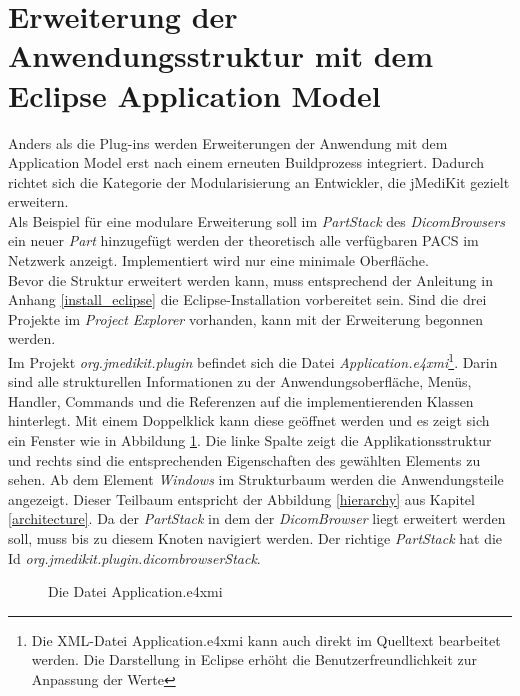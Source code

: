 \FloatBarrier
\section{Erweiterung der Anwendungsstruktur mit dem Eclipse Application Model}
Anders als die Plug-ins werden Erweiterungen der Anwendung mit dem Application Model erst nach einem erneuten Buildprozess integriert. Dadurch richtet sich die Kategorie der Modularisierung an Entwickler, die jMediKit gezielt erweitern.\\
Als Beispiel für eine modulare Erweiterung soll im \textit{PartStack} des \textit{DicomBrowsers} ein neuer \textit{Part} hinzugefügt werden der theoretisch alle verfügbaren PACS im Netzwerk anzeigt. Implementiert wird nur eine minimale Oberfläche.\\
Bevor die Struktur erweitert werden kann, muss entsprechend der Anleitung in Anhang \ref{install_eclipse} die Eclipse-Installation vorbereitet sein. Sind die drei Projekte im \textit{Project Explorer} vorhanden, kann mit der Erweiterung begonnen werden.\\
Im Projekt \textit{org.jmedikit.plugin} befindet sich die Datei \textit{Application.e4xmi}\footnote{Die XML-Datei Application.e4xmi kann auch direkt im Quelltext bearbeitet werden. Die Darstellung in Eclipse erhöht die Benutzerfreundlichkeit zur Anpassung der Werte}. Darin sind alle strukturellen Informationen zu der Anwendungsoberfläche, Menüs, Handler, Commands und die Referenzen auf die implementierenden Klassen hinterlegt. Mit einem Doppelklick kann diese geöffnet werden und es zeigt sich ein Fenster wie in Abbildung \ref{e4xmi}. Die linke Spalte zeigt die Applikationsstruktur und rechts sind die entsprechenden Eigenschaften des gewählten Elements zu sehen. Ab dem Element \textit{Windows} im Strukturbaum werden die Anwendungsteile angezeigt. Dieser Teilbaum entspricht der Abbildung \ref{hierarchy} aus Kapitel \ref{architecture}. Da der \textit{PartStack} in dem der \textit{DicomBrowser} liegt erweitert werden soll, muss bis zu diesem Knoten navigiert werden. Der richtige \textit{PartStack} hat die Id \textit{org.jmedikit.plugin.dicombrowserStack}.
\begin{figure}[H]
  \vspace{0.5cm}
  \centering
   \caption{Die Datei Application.e4xmi}
  \label{e4xmi}
  \vspace{0.5cm}
\end{figure}

